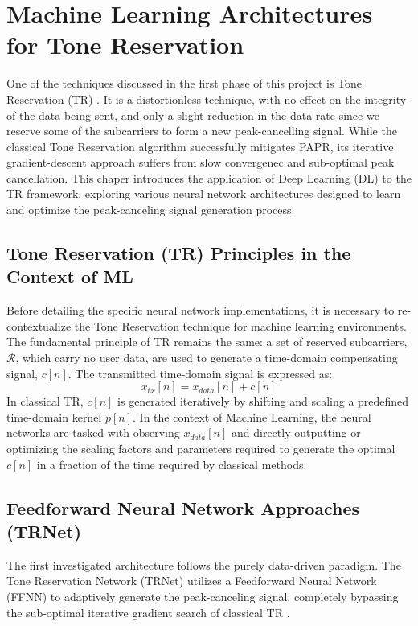 \chapter{Machine Learning Architectures for Tone Reservation}

One of the techniques discussed in the first phase of this project is Tone Reservation (TR) \cite{original_tr}. It is a distortionless technique, with no effect on the integrity of the data being sent, and only a slight reduction in the data rate since we reserve some of the subcarriers to form a new peak-cancelling signal. While the classical Tone Reservation algorithm successfully mitigates PAPR, its iterative gradient-descent approach suffers from slow convergenec and sub-optimal peak cancellation. This chaper introduces the application of Deep Learning (DL) to the TR framework, exploring various neural network architectures designed to learn and optimize the peak-canceling signal generation process.

\section{Tone Reservation (TR) Principles in the Context of ML}
Before detailing the specific neural network implementations, it is necessary to re-contextualize the Tone Reservation technique for machine learning environments. The fundamental principle of TR remains the same: a set of reserved subcarriers, $\mathcal{R}$, which carry no user data, are used to generate a time-domain compensating signal, $c[n]$. The transmitted time-domain signal is expressed as:
\begin{equation*}
    x_{tx}[n] = x_{data}[n] + c[n]
\end{equation*} \cite{original_tr}
In classical TR, $c[n]$ is generated iteratively by shifting and scaling a predefined time-domain kernel $p[n]$. In the context of Machine Learning, the neural networks are tasked with observing $x_{data}[n]$ and directly outputting or optimizing the scaling factors and parameters required to generate the optimal $c[n]$ in a fraction of the time required by classical methods.

\section{Feedforward Neural Network Approaches (TRNet)}
The first investigated architecture follows the purely data-driven paradigm. The Tone Reservation Network (TRNet) utilizes a Feedforward Neural Network (FFNN) to adaptively generate the peak-canceling signal, completely bypassing the sub-optimal iterative gradient search of classical TR \cite{trnet}.

